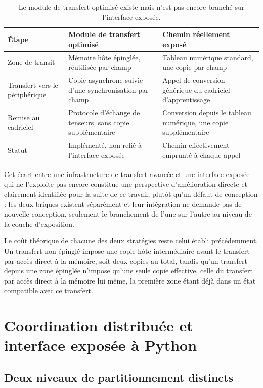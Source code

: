 \documentclass[12pt,a4paper]{report}
\begin{document}
\begin{table}[htbp]
\centering
\renewcommand{\arraystretch}{1.5}
\begin{tabular}{|p{4.0cm}|p{5.0cm}|p{4.0cm}|}
\hline
\textbf{Étape} & \textbf{Module de transfert optimisé} & \textbf{Chemin réellement exposé} \\
\hline
Zone de transit & Mémoire hôte épinglée, réutilisée par champ & Tableau numérique standard, une copie par champ \\
\hline
Transfert vers le périphérique & Copie asynchrone suivie d'une synchronisation par champ & Appel de conversion générique du cadriciel d'apprentissage \\
\hline
Remise au cadriciel & Protocole d'échange de tenseurs, sans copie supplémentaire & Conversion depuis le tableau numérique, une copie supplémentaire \\
\hline
Statut & Implémenté, non relié à l'interface exposée & Chemin effectivement emprunté à chaque appel \\
\hline
\end{tabular}
\caption{Le module de transfert optimisé existe mais n'est pas encore branché sur l'interface exposée.}
\label{tab:gpu_gap}
\end{table}

Cet écart entre une infrastructure de transfert avancée et une interface exposée qui ne l'exploite pas encore constitue une perspective d'amélioration directe et clairement identifiée pour la suite de ce travail, plutôt qu'un défaut de conception : les deux briques existent séparément et leur intégration ne demande pas de nouvelle conception, seulement le branchement de l'une sur l'autre au niveau de la couche d'exposition.

Le coût théorique de chacune des deux stratégies reste celui établi précédemment. Un transfert non épinglé impose une copie hôte intermédiaire avant le transfert par accès direct à la mémoire, soit deux copies au total, tandis qu'un transfert depuis une zone épinglée n'impose qu'une seule copie effective, celle du transfert par accès direct à la mémoire lui même, la première zone étant déjà dans un état compatible avec ce transfert.

\section{Coordination distribuée et interface exposée à Python}
\label{sec:coordination_bindings}

\subsection{Deux niveaux de partitionnement distincts}
\end{document}
